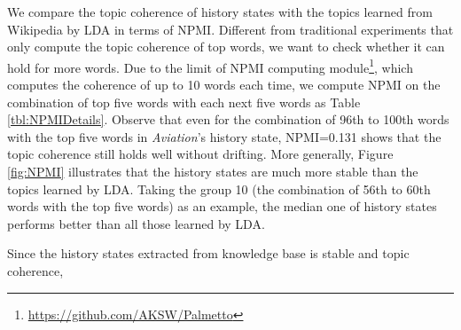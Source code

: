 \documentclass[runningheads,a4paper]{llncs}
\begin{document}
We compare the topic coherence of history states with the topics learned from Wikipedia by LDA in terms of NPMI\cite{Rder2015ExploringTS}.
Different from traditional experiments that only compute the topic coherence of top words, we want to check whether  it can hold for more words.
Due to the limit of NPMI computing module\footnote{\url{https://github.com/AKSW/Palmetto}}, which computes the coherence of up to 10 words each time, we compute NPMI on the combination of top five words with each next five words as Table \ref{tbl:NPMIDetails}.
Observe that even for the combination of 96th to 100th words with the top five words in \textit{Aviation}'s history state, NPMI=0.131 shows that the topic coherence still holds well without drifting.
More generally, Figure \ref{fig:NPMI} illustrates that the history states are much more stable than the topics learned by LDA.
Taking the group 10 (the combination of 56th to 60th words with the top five words) as an example, the median one of history states performs better than all those learned by LDA. 

Since the history states extracted from knowledge base is stable and topic coherence, 



\end{document}
